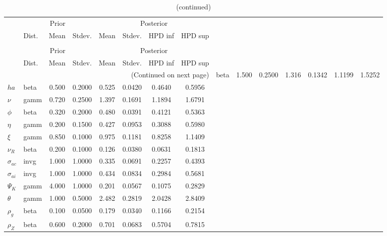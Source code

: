  
\begin{center}
\begin{longtable}{llcccccc} 
\caption{Results from Metropolis-Hastings (parameters)}
 \label{Table:MHPosterior:1}\\
\toprule 
  & \multicolumn{3}{c}{Prior}  &  \multicolumn{4}{c}{Posterior} \\
  \cmidrule(r{.75em}){2-4} \cmidrule(r{.75em}){5-8}
  & Dist. & Mean  & Stdev. & Mean & Stdev. & HPD inf & HPD sup\\
\midrule \endfirsthead 
\caption{(continued)}\\\toprule 
  & \multicolumn{3}{c}{Prior}  &  \multicolumn{4}{c}{Posterior} \\
  \cmidrule(r{.75em}){2-4} \cmidrule(r{.75em}){5-8}
  & Dist. & Mean  & Stdev. & Mean & Stdev. & HPD inf & HPD sup\\
\midrule \endhead 
\bottomrule \multicolumn{8}{r}{(Continued on next page)} \endfoot 
\bottomrule \endlastfoot 
${\sigma}$ & beta &   1.500 & 0.2500 &   1.316& 0.1342 &  1.1199 &  1.5252 \\ 
${ha}$ & beta &   0.500 & 0.2000 &   0.525& 0.0420 &  0.4640 &  0.5956 \\ 
$\nu$ & gamm &   0.720 & 0.2500 &   1.397& 0.1691 &  1.1894 &  1.6791 \\ 
${\phi}$ & beta &   0.320 & 0.2000 &   0.480& 0.0391 &  0.4121 &  0.5363 \\ 
${\eta}$ & gamm &   0.200 & 0.1500 &   0.427& 0.0953 &  0.3088 &  0.5980 \\ 
$\xi$ & gamm &   0.850 & 0.1000 &   0.975& 0.1181 &  0.8258 &  1.1409 \\ 
${\nu_R}$ & beta &   0.200 & 0.1000 &   0.126& 0.0380 &  0.0631 &  0.1813 \\ 
${\sigma_{ac}}$ & invg &   1.000 & 1.0000 &   0.335& 0.0691 &  0.2257 &  0.4393 \\ 
${\sigma_{ai}}$ & invg &   1.000 & 1.0000 &   0.434& 0.0834 &  0.2984 &  0.5681 \\ 
${\Psi_{K}}$ & gamm &   4.000 & 1.0000 &   0.201& 0.0567 &  0.1075 &  0.2829 \\ 
${\theta}$ & gamm &   1.000 & 0.5000 &   2.482& 0.2819 &  2.0428 &  2.8409 \\ 
${\rho_g}$ & beta &   0.100 & 0.0500 &   0.179& 0.0340 &  0.1166 &  0.2154 \\ 
${\rho_Z}$ & beta &   0.600 & 0.2000 &   0.701& 0.0683 &  0.5704 &  0.7815 \\ 

\end{longtable}
\end{center}

